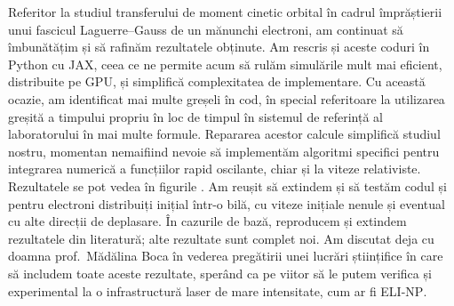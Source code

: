 Referitor la studiul transferului de moment cinetic orbital în cadrul împrăștierii unui fascicul Laguerre--Gauss de un mănunchi electroni, am continuat să îmbunătățim și să rafinăm rezultatele obținute. Am rescris și aceste coduri în Python cu JAX, ceea ce ne permite acum să rulăm simulările mult mai eficient, distribuite pe GPU, și simplifică complexitatea de implementare. Cu această ocazie, am identificat mai multe greșeli în cod, în special referitoare la utilizarea greșită a timpului propriu în loc de timpul în sistemul de referință al laboratorului în mai multe formule. Repararea acestor calcule simplifică studiul nostru, momentan nemaifiind nevoie să implementăm algoritmi specifici pentru integrarea numerică a funcțiilor rapid oscilante, chiar și la viteze relativiste. Rezultatele se pot vedea în figurile . Am reușit să extindem și să testăm codul și pentru electroni distribuiți inițial într-o bilă, cu viteze inițiale nenule și eventual cu alte direcții de deplasare. În cazurile de bază, reproducem și extindem rezultatele din literatură; alte rezultate sunt complet noi. Am discutat deja cu doamna prof.~Mădălina Boca în vederea pregătirii unei lucrări științifice în care să includem toate aceste rezultate, sperând ca pe viitor să le putem verifica și experimental la o infrastructură laser de mare intensitate, cum ar fi \textsc{ELI-NP}.

